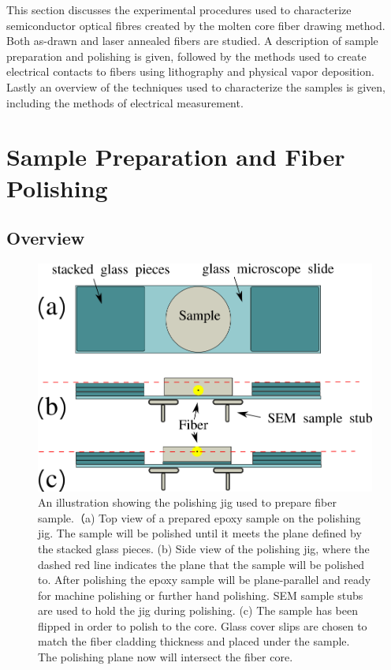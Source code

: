 This section discusses the experimental procedures used to characterize semiconductor optical fibres created by the molten core fiber drawing method. Both as-drawn and laser annealed fibers are studied.  A description of sample preparation and polishing is given, followed by the methods used to create electrical contacts to fibers using lithography and physical vapor deposition. Lastly an overview of the techniques used to characterize the samples is given, including the methods of electrical measurement.

\section{Sample Preparation and Fiber Polishing}
\subsection{Overview}

\begin{figure}[]
    \centering
    \includegraphics[width=\textwidth]{fig/Methods/polishing_jig.png}
    \caption{An illustration showing the polishing jig used to prepare fiber sample.（a) Top view of a prepared epoxy sample on the polishing jig. The sample will be polished until it meets the plane defined by the stacked glass pieces. (b) Side view of the polishing jig, where the dashed red line indicates the plane that the sample will be polished to. After polishing the epoxy sample will be plane-parallel and ready for machine polishing or further hand polishing. SEM sample stubs are used to hold the jig during polishing. (c) The sample has been flipped in order to polish to the core. Glass cover slips are chosen to match the fiber cladding thickness and placed under the sample. The polishing plane now will intersect the fiber core.}
    \label{fig:jig}
\end{figure}

